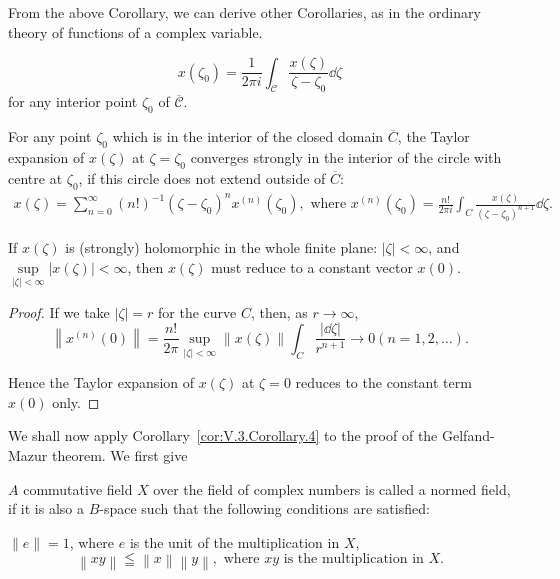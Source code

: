 From the above Corollary, we can derive other Corollaries, as in the ordinary theory of functions of a complex variable. 

\begin{corollary}\label{cor:V.3.Corollary.2} 
\[
x(\zeta_0)=\frac{1}{2\pi i}\int_{\mathcal C}\frac{x(\zeta)}{\zeta-\zeta_0}\dd\zeta
\]
for any interior point $\zeta_0$ of $\overline{\mathcal C}$.
\end{corollary}

\begin{corollary}\label{cor:V.3.Corollary.3} For any point $\zeta_0$ which is in the interior of the closed domain $\overline{C}$, the Taylor expansion of $x(\zeta)$ at $\zeta = \zeta_0$ converges strongly in the interior of the circle with centre at $\zeta_0$, if this circle does not extend outside of $\overline{C}$: 
\[
\begin{gathered}
x (\zeta) = \sum\limits_{n=0} ^{\infty} (n!) ^{-1} (\zeta - \zeta_{0}) ^{n} x ^{(n)} (\zeta_{0}), \text{ where } x ^{(n)} (\zeta_{0}) = \frac {n !}{2 \pi i} \int_{C} \frac {x (\zeta)}{(\zeta - \zeta_{0}) ^{n+1}} \dd \zeta .
\end{gathered}
\]
\end{corollary}

\begin{corollary}\label{cor:V.3.Corollary.4} If $x(\zeta)$ is (strongly) holomorphic in the whole finite plane: $|\zeta| < \infty$, and $\sup\limits_{|\zeta| < \infty} |x(\zeta)| < \infty$, then $x(\zeta)$ must reduce to a constant vector $x(0)$. 
\end{corollary}

\begin{proof}
 If we take $\left|\zeta\right|=r$ for the curve $C$, then, as $r\to\infty$, 
\[
\left\| x ^{(n)} (0) \right\| = \frac {n !}{2 \pi} \sup\limits _{| \zeta | < \infty} \left\| x (\zeta) \right\| \int_{C} \frac {| \dd \zeta |}{r ^{n+1}} \rightarrow 0 (n = 1, 2, \dots). \]

Hence the Taylor expansion of $x(\zeta)$ at $\zeta = 0$ reduces to the constant term $x(0)$ only. 
\end{proof}

We shall now apply Corollary~\ref{cor:V.3.Corollary.4} to the proof of the Gelfand-Mazur theorem. We first give 

\begin{definition}\label{def:V.3.Definition.2} $A$ commutative field $X$ over the field of complex numbers is called a normed field, if it is also a $B$-space such that the following conditions are satisfied: 

$\|e\| = 1$, where $e$ is the unit of the multiplication in $X$, 
\begin{equation}\label{eq:V.3.1}
\left\| x y \right\| \leqq \left\| x \right\| \left\| y \right\|, \text{ where } x y \text{ is the multiplication in } X.
\end{equation}
\end{definition}

